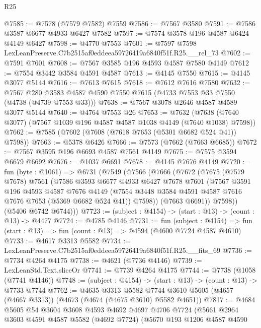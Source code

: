 \begin{lexlean}{R25}
\begin{coremodule}
@7585 := @7578 (@7579 @7582) @7559
@7586 := @7567 @3580
@7591 := @7586 @3587 @6677 @4933 @6427 @7582
@7597 := @7574 @3578 @196 @4587 @6424 @4149 @6427
@7598 := @4770 @7553
@7601 := @7597 @7598 LexLeanPreserve.C7b2515af0eddeea59726419a6840f51f.R25.__rel_73
@7602 := @7591 @7601
@7608 := @7567 @3585 @196 @4593 @4587 @7580 @4149
@7612 := @7554 @3442 @3584 @4591 @4587
@7613 := @4145 @7550
@7615 := @4145 @3077 @5144
@7616 := @7613 @7615
@7618 := @7612 @7616 @7580
@7632 := @7567 @280 @3583 @4587 @4590 @7550 @7615 (@4733 @7553 @33 @7550 (@4738 (@4739 @7553 @33)))
@7638 := @7567 @3078 @2646 @4587 @4589 @3077 @5144
@7640 := @4764 @7553 @26
@7653 := @7632 (@7638 (@7640 @3077) (@7567 @1039 @196 @4587 @4587 @1038 @4149 (@7640 @1038) @7598))
@7662 := @7585 (@7602 (@7608 (@7618 @7653 (@5301 @6682 @524 @41)) @7598))
@7663 := @5378 @6426
@7666 := @7573 (@7662 (@7663 @6685))
@7672 := @7567 @3595 @196 @6693 @4587 @7561 @4149
@7675 := @7575 @3594 @6679 @6692
@7676 := @1037 @6691
@7678 := @4145 @7676 @4149
@7720 := fun (byte : @1061) =>
  @6731
    (@7549
      (@7566
        (@7666
          (@7672
            (@7675
              (@7579 @7678)
              @7561
              (@7586
                @3593
                @6677
                @4933
                @6427
                @7678
                @7601
                (@7567
                  @3591
                  @196
                  @4593
                  @4587
                  @7676
                  @4149
                  (@7554 @3448 @3584 @4591 @4587 @7616 @7676 @7653 (@5369 @6682 @524 @41))
                  @7598))
              (@7663 @6691))
            @7598))
        (@5406 @6742 @6744)))
@7723 := (subject : @4154) -> (start : @13) -> (count : @13) -> @4477
@7724 := @4785 @4146
@7731 := fun (subject : @4154) =>
  fun (start : @13) => fun (count : @13) => @4594 (@4600 @7724 @4587 @4610)
@7733 := @4617 @3313 @5582
@7734 := LexLeanPreserve.C7b2515af0eddeea59726419a6840f51f.R25.__fits_69
@7736 := @7734 @4264 @4175
@7738 := @4621 (@7736 @4146)
@7739 := LexLeanStd.Text.sliceOr
@7741 := @7739 @4264 @4175
@7744 := @7738 (@1058 (@7741 @4146))
@7748 := (subject : @4154) -> (start : @13) -> (count : @13) -> @7733 @7744
@7762 := @4635
    @3313
    @5582
    @7744
    @3610
    @5605
    (@4657 (@4667 @3313))
    (@4673 (@4674 (@4675 @3610) @5582 @4651))
@7817 := @4684
    @5605
    @54
    @3604
    @3608
    @4593
    @4692
    @4697
    @4706
    @7724
    (@5661
      @2964
      @3603
      @4591
      @4587
      @5582
      (@4692 @7724)
      (@5670
        @193
        @1206
        @4587
        @4590

\end{coremodule}
\end{lexlean}
